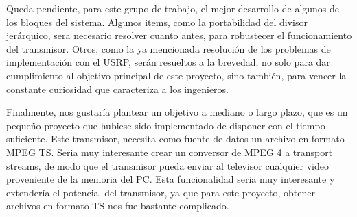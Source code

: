 Queda pendiente, para este grupo de trabajo, el mejor desarrollo de algunos de los bloques del sistema. Algunos items, como la portabilidad del divisor jerárquico, sera necesario resolver cuanto antes, para robustecer el funcionamiento del transmisor. Otros, como la ya mencionada resolución de los problemas de implementación con el USRP, serán resueltos a la brevedad, no solo para dar cumplimiento al objetivo principal de este proyecto, sino también, para vencer la constante curiosidad que caracteriza a los ingenieros.

Finalmente, nos gustaría plantear un objetivo a mediano o largo plazo, que es un pequeño proyecto que hubiese sido implementado de disponer con el tiempo suficiente. Este transmisor, necesita como fuente de datos un archivo en formato MPEG TS. Seria muy interesante crear un conversor de MPEG 4 a transport streams, de modo que el transmisor pueda  enviar al televisor cualquier video proveniente de la memoria del PC. Esta funcionalidad seria muy interesante y extendería el potencial del transmisor, ya que para este proyecto, obtener archivos en formato TS nos fue bastante complicado.
